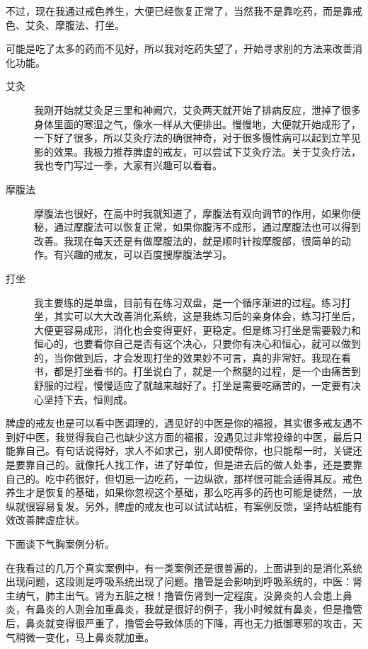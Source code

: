 不过，现在我通过戒色养生，大便已经恢复正常了，当然我不是靠吃药，而是靠戒色、艾灸、摩腹法、打坐。

可能是吃了太多的药而不见好，所以我对吃药失望了，开始寻求别的方法来改善消化功能。

\begin{description}
    \item[艾灸] 我刚开始就艾灸足三里和神阙穴，艾灸两天就开始了排病反应，泄掉了很多身体里面的寒湿之气，像水一样从大便排出。慢慢地，大便就开始成形了，一下好了很多，所以艾灸疗法的确很神奇，对于很多慢性病可以起到立竿见影的效果。我极力推荐脾虚的戒友，可以尝试下艾灸疗法。关于艾灸疗法，我也专门写过一季，大家有兴趣可以看看。
    \item[摩腹法] 摩腹法也很好，在高中时我就知道了，摩腹法有双向调节的作用，如果你便秘，通过摩腹法可以恢复正常，如果你腹泻不成形，通过摩腹法也可以得到改善。我现在每天还是有做摩腹法的，就是顺时针按摩腹部，很简单的动作。有兴趣的戒友，可以百度搜摩腹法学习。
    \item[打坐] 我主要练的是单盘，目前有在练习双盘，是一个循序渐进的过程。练习打坐，其实可以大大改善消化系统，这是我练习后的亲身体会，练习打坐后，大便更容易成形，消化也会变得更好，更稳定。但是练习打坐是需要毅力和恒心的，也要看你自己是否有这个决心，只要你有决心和恒心，就可以做到的，当你做到后，才会发现打坐的效果妙不可言，真的非常好。我现在看书，都是打坐看书的。打坐说白了，就是一个熬腿的过程，是一个由痛苦到舒服的过程，慢慢适应了就越来越好了。打坐是需要吃痛苦的，一定要有决心坚持下去，恒则成。
\end{description}

脾虚的戒友也是可以看中医调理的，遇见好的中医是你的福报，其实很多戒友遇不到好中医，我觉得我自己也缺少这方面的福报，没遇见过非常投缘的中医，最后只能靠自己。有句话说得好，求人不如求己，别人即使帮你，也只能帮一时，关键还是要靠自己的。就像托人找工作，进了好单位，但是进去后的做人处事，还是要靠自己的。吃中药很好，但切忌一边吃药，一边纵欲，那样很可能会适得其反。戒色养生才是恢复的基础，如果你忽视这个基础，那么吃再多的药也可能是徒然，一放纵就很容易复发。另外，脾虚的戒友也可以试试站桩，有案例反馈，坚持站桩能有效改善脾虚症状。

下面谈下气胸案例分析。

在我看过的几万个真实案例中，有一类案例还是很普遍的，上面讲到的是消化系统出现问题，这段则是呼吸系统出现了问题。撸管是会影响到呼吸系统的，中医：肾主纳气，肺主出气。肾为五脏之根！撸管伤肾到一定程度，没鼻炎的人会患上鼻炎，有鼻炎的人则会加重鼻炎，我就是很好的例子，我小时候就有鼻炎，但是撸管后，鼻炎就变得很严重了，撸管会导致体质的下降，再也无力抵御寒邪的攻击，天气稍微一变化，马上鼻炎就加重。

